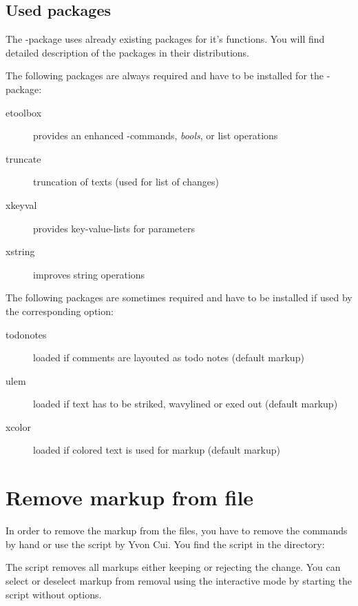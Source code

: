 \subsection{Used packages}
\label{sec:ui:packages}

The -package uses already existing packages for it's functions.
You will find detailed description of the packages in their distributions.

The following packages are always required and have to be installed for the -package:
\begin{description}
	\item [etoolbox] provides an enhanced -commands, \emph{bools}, or list operations
	\item [truncate] truncation of texts (used for list of changes)
	\item [xkeyval] provides key-value-lists for parameters
	\item [xstring] improves string operations
\end{description}

The following packages are sometimes required and have to be installed if used by the corresponding option:
\begin{description}
	\item [todonotes] loaded if comments are layouted as todo notes (default markup)
	\item [ulem] loaded if text has to be striked, wavylined or exed out (default markup)
	\item [xcolor] loaded if colored text is used for markup (default markup)
\end{description}


\cleardoublepage
\section{Remove markup from file}
\label{sec:remove-markup}

In order to remove the markup from the  files, you have to remove the commands by hand or use the script by Yvon Cui.
You find the script in the directory:


The script removes all markups either keeping or rejecting the change.
You can select or deselect markup from removal using the interactive mode by starting the script without options.

